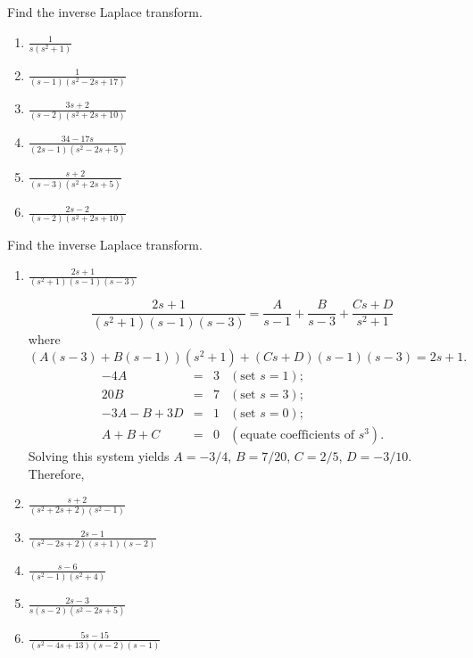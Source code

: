 \documentclass{ximera}
\begin{document}
\begin{problem}\label{exer:8.2.7}
Find the inverse Laplace transform.

\begin{enumerate}
    \item $\frac{1}{s(s^2+1)}$
    \item $\frac{1}{(s-1)(s^2-2s+17)}$
    \item $\frac{3s+2}{(s-2)(s^2+2s+10)}$
    \item $\frac{34-17s}{(2s-1)(s^2-2s+5)}$
    \item $\frac{s+2}{(s-3)(s^2+2s+5)}$
    \item $\frac{2s-2}{(s-2)(s^2+2s+10)}$
\end{enumerate}
\end{problem}

\begin{problem}\label{exer:8.2.8}
 Find the inverse Laplace transform.
\begin{enumerate}
\item $\frac{2s+1}{(s^2+1)(s-1)(s-3)}$

\begin{solution}
$$
\frac{2s+1}{(s^2+1)(s-1)(s-3)}
=\frac{A}{s-1}+\frac{B}{s-3}+\frac{Cs+D}{s^2+1}
$$
where
$$
(A(s-3)+B(s-1))(s^2+1)+(Cs+D)(s-1)(s-3)=2s+1.
$$
$$
\begin{array}{rcrl}
-4A&=&3&(\mbox{set }s=1);\\
20B&=&7& (\mbox{set }s=3);\\
-3A-B+3D&=&1& (\mbox{set }s=0);\\
A+B+C&=&0&(\mbox{equate coefficients of }s^3).
\end{array}
$$
Solving this system yields $A=-3/4$, $B=7/20$,
$C=2/5$, $D=-3/10$. Therefore,
\end{solution}

\item $\frac{s+2}{(s^2+2s+2)(s^2-1)}$



\item $\frac{2s-1}{(s^2-2s+2)(s+1)(s-2)}$



    \item $\frac{s-6}{(s^2-1)(s^2+4)}$
    \item $\frac{2s-3}{s(s-2)(s^2-2s+5)}$
    \item $\frac{5s-15}{(s^2-4s+13)(s-2)(s-1)}$
\end{enumerate}
\end{problem}
\end{document}

